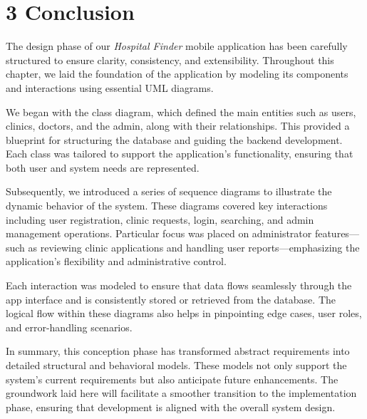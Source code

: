\documentclass[12pt]{report}
\begin{document}
\section*{3 Conclusion}

\vspace{1em}

\noindent
The design phase of our \textit{Hospital Finder} mobile application has been carefully structured to ensure clarity, consistency, and extensibility. Throughout this chapter, we laid the foundation of the application by modeling its components and interactions using essential UML diagrams.
\vspace{1em}

\noindent
We began with the class diagram, which defined the main entities such as users, clinics, doctors, and the admin, along with their relationships. This provided a blueprint for structuring the database and guiding the backend development. Each class was tailored to support the application's functionality, ensuring that both user and system needs are represented.

\vspace{1em}

\noindent
Subsequently, we introduced a series of sequence diagrams to illustrate the dynamic behavior of the system. These diagrams covered key interactions including user registration, clinic requests, login, searching, and admin management operations. Particular focus was placed on administrator features—such as reviewing clinic applications and handling user reports—emphasizing the application's flexibility and administrative control.

\vspace{1em}

\noindent
Each interaction was modeled to ensure that data flows seamlessly through the app interface and is consistently stored or retrieved from the database. The logical flow within these diagrams also helps in pinpointing edge cases, user roles, and error-handling scenarios.

\vspace{1em}

\noindent
In summary, this conception phase has transformed abstract requirements into detailed structural and behavioral models. These models not only support the system’s current requirements but also anticipate future enhancements. The groundwork laid here will facilitate a smoother transition to the implementation phase, ensuring that development is aligned with the overall system design.
\end{document}
